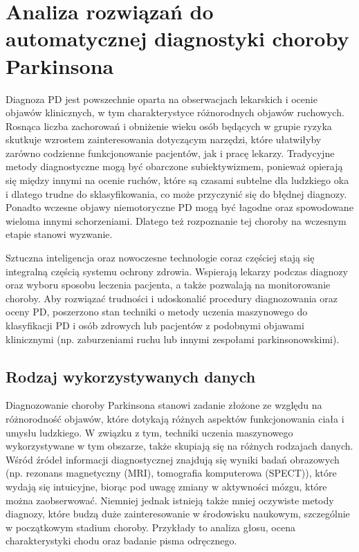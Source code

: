 \chapter{Analiza rozwiązań do automatycznej diagnostyki choroby Parkinsona}\label{ch:analiza-rozwiazan}


Diagnoza PD jest powszechnie oparta na obserwacjach lekarskich i ocenie objawów klinicznych, w tym charakterystyce różnorodnych objawów ruchowych.
Rosnąca liczba zachorowań i obniżenie wieku osób będących w grupie ryzyka skutkuje wzrostem zainteresowania dotyczącym narzędzi, które ułatwiłyby
zarówno codzienne funkcjonowanie pacjentów, jak i pracę lekarzy.
Tradycyjne metody diagnostyczne mogą być obarczone subiektywizmem, ponieważ opierają się między innymi na ocenie ruchów, które są czasami subtelne dla
ludzkiego oka i dlatego trudne do sklasyfikowania, co może przyczynić się do błędnej diagnozy.
Ponadto wczesne objawy niemotoryczne PD mogą być łagodne oraz spowodowane wieloma innymi schorzeniami.
Dlatego też rozpoznanie tej choroby na wczesnym etapie stanowi wyzwanie.

Sztuczna inteligencja oraz nowoczesne technologie coraz częściej stają się integralną częścią systemu ochrony zdrowia.
Wspierają lekarzy podczas diagnozy oraz wyboru sposobu leczenia pacjenta, a także pozwalają na monitorowanie choroby.
Aby rozwiązać trudności i udoskonalić procedury diagnozowania oraz oceny PD, poszerzono stan techniki o metody uczenia maszynowego do
klasyfikacji PD i osób zdrowych lub pacjentów z podobnymi objawami klinicznymi (np.
zaburzeniami ruchu lub innymi zespołami parkinsonowskimi).
\section{Rodzaj wykorzystywanych danych}\label{sec:dane-przeglad}

Diagnozowanie choroby Parkinsona stanowi zadanie złożone ze względu na różnorodność objawów, które dotykają różnych aspektów
funkcjonowania ciała i umysłu ludzkiego.
W związku z tym, techniki uczenia maszynowego wykorzystywane w tym obszarze, także skupiają się na różnych rodzajach danych.
Wśród źródeł informacji diagnostycznej znajdują się wyniki badań obrazowych (np.
rezonans magnetyczny (MRI), tomografia komputerowa (SPECT)),
które wydają się intuicyjne, biorąc pod uwagę zmiany w aktywności mózgu, które można zaobserwować.
Niemniej jednak istnieją także mniej oczywiste metody diagnozy, które budzą duże zainteresowanie w środowisku naukowym, szczególnie w początkowym stadium choroby.
Przykłady to analiza głosu, ocena charakterystyki chodu oraz badanie pisma odręcznego.

